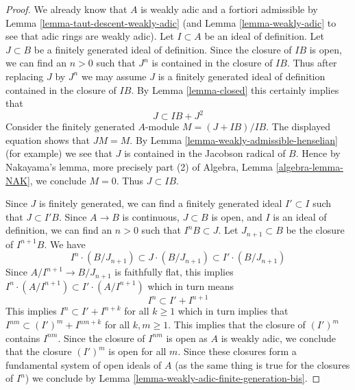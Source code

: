 \documentclass{stacks-project}
\theoremstyle{plain}
\theoremstyle{definition}
\theoremstyle{remark}
\numberwithin{equation}{subsection}
\begin{document}
\begin{proof}
We already know that $A$ is weakly adic and a fortiori admissible by
Lemma \ref{lemma-taut-descent-weakly-adic}
(and Lemma \ref{lemma-weakly-adic} to see that adic rings are weakly adic).
Let $I \subset A$ be an ideal of definition.
Let $J \subset B$ be a finitely generated ideal of definition.
Since the closure of $IB$ is open, we can find an $n > 0$ such that
$J^n$ is contained in the closure of $IB$. Thus after replacing $J$
by $J^n$ we may assume $J$ is a finitely generated ideal
of definition contained in the closure of $IB$. By Lemma \ref{lemma-closed}
this certainly implies that
$$
J \subset IB + J^2
$$
Consider the finitely generated $A$-module $M = (J + IB)/IB$.
The displayed equation shows that $JM = M$.
By Lemma \ref{lemma-weakly-admissible-henselian} (for example)
we see that $J$ is contained in the Jacobson radical of $B$.
Hence by Nakayama's lemma, more precisely part (2) of
Algebra, Lemma \ref{algebra-lemma-NAK}, we conclude $M = 0$.
Thus $J \subset IB$.

\medskip\noindent
Since $J$ is finitely generated, we can find a finitely generated
ideal $I' \subset I$ such that $J \subset I'B$.
Since $A \to B$ is continuous, $J \subset B$ is open, and
$I$ is an ideal of definition, we can find an $n > 0$ such that
$I^nB \subset J$. Let $J_{n + 1} \subset B$ be the closure of
$I^{n + 1}B$.
We have
$$
I^n \cdot (B/J_{n + 1}) \subset J \cdot (B/J_{n + 1}) \subset
I' \cdot (B/J_{n + 1})
$$
Since $A/I^{n + 1} \to B/J_{n + 1}$ is faithfully flat, this
implies $I^n \cdot (A/I^{n + 1}) \subset I' \cdot (A/I^{n + 1})$
which in turn means
$$
I^n \subset I' + I^{n + 1}
$$
This implies $I^n \subset I'  + I^{n + k}$ for all $k \geq 1$
which in turn implies that $I^{nm} \subset (I')^m + I^{nm + k}$
for all $k, m \geq 1$. This implies that the closure of
$(I')^m$ contains $I^{nm}$. Since the closure of $I^{nm}$ is open
as $A$ is weakly adic,
we conclude that the closure $(I')^m$ is open for all $m$.
Since these closures form a fundamental system of open ideals
of $A$ (as the same thing is true for the closures of $I^n$)
we conclude by Lemma \ref{lemma-weakly-adic-finite-generation-bis}.
\end{proof}
\end{document}
